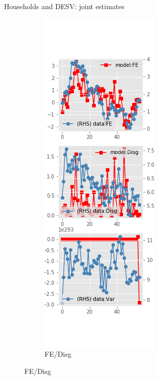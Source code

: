 \documentclass{beamer}
\begin{document}
\begin{frame}{Households and DESV: joint estimates}
\begin{figure}[ht]
\begin{subfigure}[b]{0.2\textwidth}
		\end{subfigure}
		\hfill
		\begin{subfigure}[b]{0.2\textwidth}
			\caption{FE/Disg}
			\includegraphics[width=\textwidth, height = 0.8\textheight]{figuresDraft/sce_de_est_sv_joint_diag1.png}

\end{subfigure}
\end{figure}
\end{frame}
\end{document}
